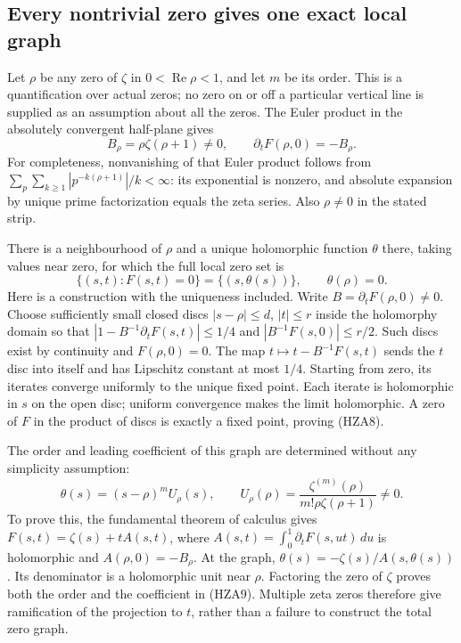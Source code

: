 \documentclass[11pt]{article}
\theoremstyle{definition}
\begin{document}
\subsection{Every nontrivial zero gives one exact local graph}

Let $\rho$ be any zero of $\zeta$ in $0<\operatorname{Re}\rho<1$,
and let $m$ be its order. This is a quantification over actual zeros;
no zero on or off a particular vertical line is supplied as an
assumption about all the zeros. The Euler product in the absolutely
convergent half-plane gives
\begin{equation}\tag{HZA7}
 B_\rho=\rho\zeta(\rho+1)\ne0,
 \qquad \partial_t F(\rho,0)=-B_\rho.
\end{equation}
For completeness, nonvanishing of that Euler product follows from
$\sum_p\sum_{k\ge1}|p^{-k(\rho+1)}|/k<\infty$: its exponential is
nonzero, and absolute expansion by unique prime factorization equals
the zeta series. Also $\rho\ne0$ in the stated strip.

There is a neighbourhood of $\rho$ and a unique holomorphic function
$\theta$ there, taking values near zero, for which the full local
zero set is
\begin{equation}\tag{HZA8}
 \{(s,t):F(s,t)=0\}=\{(s,\theta(s))\},\qquad \theta(\rho)=0.
\end{equation}
Here is a construction with the uniqueness included. Write
$B=\partial_t F(\rho,0)\ne0$. Choose sufficiently small closed
discs $|s-\rho|\le d$, $|t|\le r$ inside the holomorphy domain so
that $|1-B^{-1}\partial_tF(s,t)|\le1/4$ and
$|B^{-1}F(s,0)|\le r/2$. Such discs exist by continuity and
$F(\rho,0)=0$. The map $t\mapsto t-B^{-1}F(s,t)$ sends the
$t$ disc into itself and has Lipschitz constant at most $1/4$.
Starting from zero, its iterates converge uniformly to the unique
fixed point. Each iterate is holomorphic in $s$ on the open disc;
uniform convergence makes the limit holomorphic. A zero of $F$
in the product of discs is exactly a fixed point, proving (HZA8).

The order and leading coefficient of this graph are determined
without any simplicity assumption:
\begin{equation}\tag{HZA9}
 \theta(s)=(s-\rho)^m U_\rho(s),\qquad
 U_\rho(\rho)=\frac{\zeta^{(m)}(\rho)}{m!\rho\zeta(\rho+1)}\ne0.
\end{equation}
To prove this, the fundamental theorem of calculus gives
$F(s,t)=\zeta(s)+t A(s,t)$, where
$A(s,t)=\int_0^1\partial_tF(s,ut)\,du$ is holomorphic and
$A(\rho,0)=-B_\rho$. At the graph,
$\theta(s)=-\zeta(s)/A(s,\theta(s))$. Its denominator is a
holomorphic unit near $\rho$. Factoring the zero of $\zeta$ proves
both the order and the coefficient in (HZA9). Multiple zeta zeros
therefore give ramification of the projection to $t$, rather than a
failure to construct the total zero graph.
\end{document}
